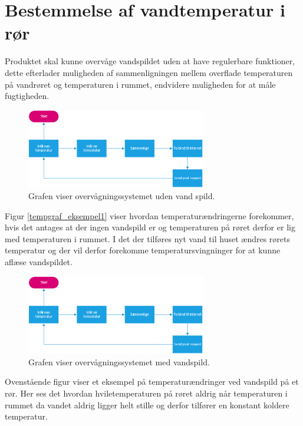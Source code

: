 \section{Bestemmelse af vandtemperatur i rør}
Produktet skal kunne overvåge vandspildet uden at have regulerbare funktioner, dette efterlader muligheden af sammenligningen mellem overflade temperaturen på vandrøret og temperaturen i rummet, endvidere muligheden for at måle fugtigheden.  

\begin{figure}[h!]
  \centering
  \includegraphics[width=0.7\textwidth]{figures/Fase2software.png}
  \caption{Grafen viser overvågningssystemet uden vand spild.}
  \label{vandspild_graf_normal}
\end{figure}



Figur \ref{tempgraf_eksempel1} viser hvordan temperaturændringerne forekommer, hvis det antages at der ingen vandspild er og temperaturen på røret derfor er lig med temperaturen i rummet. I det der tilføres nyt vand til huset ændres rørets temperatur og der vil derfor forekomme temperatursvingninger for at kunne aflæse vandspildet.





\begin{figure}[h!]
  \centering
  \includegraphics[width=0.7\textwidth]{figures/Fase2software.png}
  \caption{Grafen viser overvågningssystemet med vandspild.}
  \label{vandspild_graf_spild}
\end{figure}


Ovenstående figur viser et eksempel på temperaturændringer ved vandspild på et rør. Her ses det hvordan hviletemperaturen på røret aldrig når temperaturen i rummet da vandet aldrig ligger helt stille og derfor tilfører en konstant koldere temperatur.  



    